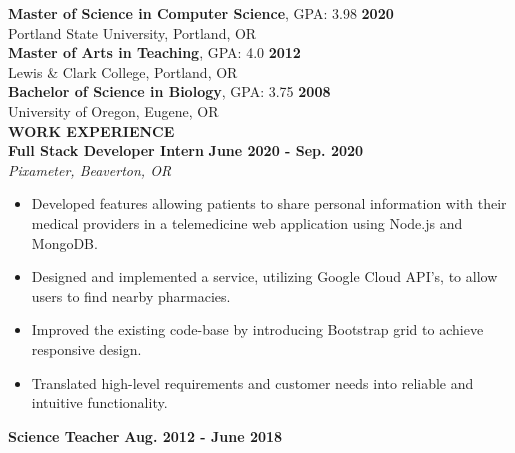 \documentclass[11pt]{article}
\begin{document}
%
\textbf{Master of Science in Computer Science}, GPA: 3.98
\hfill \textbf{2020}\\ 
Portland State University, Portland, OR
\medskip \\
%
\textbf{Master of Arts in Teaching}, GPA: 4.0
\hfill \textbf{2012} \\
Lewis \& Clark College, Portland, OR
\medskip \\
%
\textbf{Bachelor of Science in Biology}, GPA: 3.75
\hfill \textbf{2008}\\
University of Oregon, Eugene, OR
\bigskip \\
\makebox[0pt][l]{\rule[-.2\baselineskip]{\linewidth}{.3mm}}%
\large{\textbf{WORK EXPERIENCE}}\smallskip \\
%
\textbf{Full Stack Developer Intern} \hfill \textbf{June 2020 - Sep. 2020}\\
\textsl{Pixameter, Beaverton, OR} 
\begin{itemize}[leftmargin=*, itemsep=0pt, topsep=5pt]
	\item Developed features allowing patients to share personal information with their medical providers in a telemedicine web application using Node.js and MongoDB.
	\item Designed and implemented a service, utilizing Google Cloud API's, to allow users to find nearby pharmacies.
	\item Improved the existing code-base by introducing Bootstrap grid to achieve responsive design.
	\item Translated high-level requirements and customer needs into reliable and intuitive functionality.
\end{itemize}
\medbreak \noindent
%
\textbf{Science Teacher} \hfill \textbf{Aug. 2012 - June 2018}\\
\end{document}
